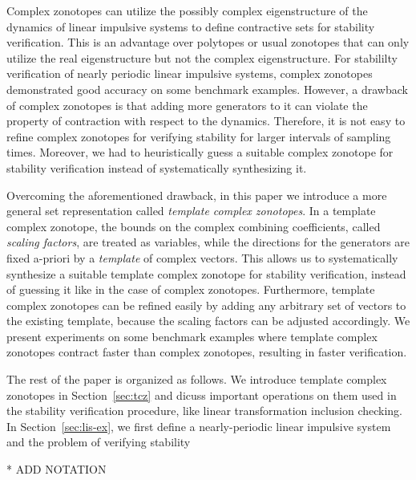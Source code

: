Complex zonotopes can utilize the possibly complex eigenstructure
of the dynamics of linear impulsive systems to define
contractive sets for stability verification.  This is an advantage
over polytopes or usual zonotopes that can only utilize the real
eigenstructure but not the complex eigenstructure.  For stabililty
verification of nearly periodic linear impulsive systems, complex
zonotopes demonstrated good accuracy on some benchmark examples.
However, a drawback of complex zonotopes is that adding more
generators to it can violate the property of contraction with respect
to the dynamics.  Therefore, it is not easy to refine complex
zonotopes for verifying stability for larger intervals of sampling
times.  Moreover, we had to heuristically guess a suitable complex
zonotope for stability verification instead of systematically
synthesizing it.

Overcoming the aforementioned drawback, in this paper we introduce a
more general set representation called \emph{template complex
zonotopes}.  In a {template complex zonotope}, the bounds on the
complex combining coefficients, called \emph{scaling factors}, are
treated as variables, while the directions for the generators are
fixed a-priori by a \emph{template} of complex vectors.  This allows
us to systematically synthesize a suitable template complex zonotope
for stability verification, instead of guessing it like in the case of
complex zonotopes.  Furthermore, template complex zonotopes can be
refined easily by adding any arbitrary set of vectors to the existing
template, because the scaling factors can be adjusted accordingly.  We
present experiments on some benchmark examples where template complex
zonotopes contract faster than complex zonotopes, resulting in faster
verification.

The rest of the paper is organized as follows.  We introduce template
complex zonotopes in Section~\ref{sec:tcz} and dicuss important
operations on them used in the stability verification procedure, like
linear transformation inclusion checking.  In
Section~\ref{sec:lis-ex}, we first define a nearly-periodic linear
impulsive system and the problem of verifying stability

* ADD NOTATION 



